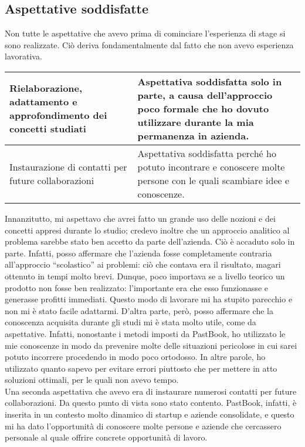 		\subsection{Aspettative soddisfatte}
			Non tutte le aspettative che avevo prima di cominciare l'esperienza di stage si sono realizzate. Ciò deriva fondamentalmente
			dal fatto che non avevo esperienza lavorativa.\\
			\begin{center}
				\begin{tabular}[H]{p{} | p{}}
					Rielaborazione, adattamento e approfondimento dei concetti studiati &
					Aspettativa soddisfatta solo in parte, a causa dell'approccio poco formale che ho dovuto utilizzare durante
					la mia permanenza in azienda.\\
					\hline
					Instaurazione di contatti per future collaborazioni &
					Aspettativa soddisfatta perché ho potuto incontrare e conoscere molte persone con le quali scambiare idee e
					conoscenze.\\
				\end{tabular}
			\end{center}
			Innanzitutto, mi aspettavo che avrei fatto un grande uso delle nozioni e dei concetti appresi durante lo studio; credevo
			inoltre che un approccio analitico al problema sarebbe stato ben accetto da parte dell'azienda. Ciò è accaduto solo in parte.
			Infatti, posso affermare che l'azienda fosse completamente contraria all'approccio “scolastico” ai problemi: ciò
			che contava era il risultato, magari ottenuto in tempi molto brevi. Dunque, poco importava se a livello teorico un prodotto
			non fosse ben realizzato: l'importante era che esso funzionasse e generasse profitti immediati. Questo modo di lavorare mi ha
			stupito parecchio e non mi è stato facile adattarmi. D'altra parte, però, posso affermare che la conoscenza acquisita
			durante gli studi mi è stata molto utile, come da aspettative. Infatti, nonostante i metodi imposti da PastBook, ho
			utilizzato le mie conoscenze in modo da prevenire molte delle situazioni pericolose in cui sarei potuto incorrere
			procedendo in modo poco ortodosso. In altre parole, ho utilizzato quanto sapevo per evitare errori piuttosto che per mettere
			in atto soluzioni ottimali, per le quali non avevo tempo.\\
			Una seconda aspettativa che avevo era di instaurare numerosi contatti per future collaborazioni. Da questo punto di vista
			sono stato contento. PastBook, infatti, è inserita in un contesto molto dinamico di startup e aziende consolidate, e questo
			mi ha dato l'opportunità di conoscere molte persone e aziende che cercassero personale al quale offrire concrete opportunità
			di lavoro.
